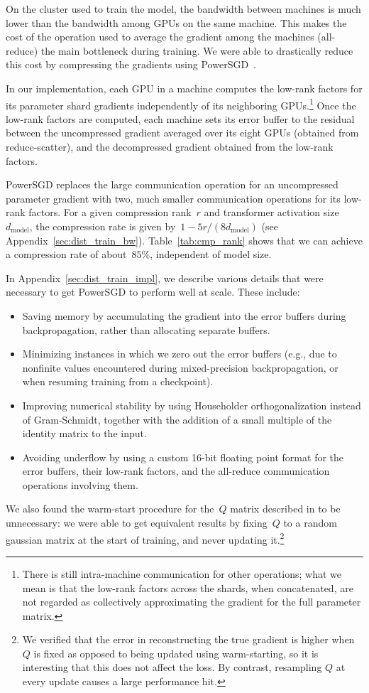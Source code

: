 \documentclass{article}
\begin{document}
On the cluster used to train the model, the bandwidth between machines is much lower than the bandwidth among GPUs on the same machine. This makes the cost of the operation used to average the gradient among the machines (all-reduce) the main bottleneck during training. We were able to drastically reduce this cost by compressing the gradients using PowerSGD~\cite{vogels2019powersgd}.

In our implementation, each GPU in a machine computes the low-rank factors for its parameter shard gradients independently of its neighboring GPUs.\footnote{There is still intra-machine communication for other operations; what we mean is that the low-rank factors across the shards, when concatenated, are not regarded as collectively approximating the gradient for the full parameter matrix.} Once the low-rank factors are computed, each machine sets its error buffer to the residual between the uncompressed gradient averaged over its eight GPUs (obtained from reduce-scatter), and the decompressed gradient obtained from the low-rank factors.

PowerSGD replaces the large communication operation for an uncompressed parameter gradient with two, much smaller communication operations for its low-rank factors. For a given compression rank~$r$ and transformer activation size~$d_\mathrm{model}$, the compression rate is given by~$1 - 5 r / (8 d_\textrm{model})$ (see Appendix~\ref{sec:dist_train_bw}). Table~\ref{tab:cmp_rank} shows that we can achieve a compression rate of about~$85\%$, independent of model size.

In Appendix~\ref{sec:dist_train_impl}, we describe various details that were necessary to get PowerSGD to perform well at scale. These include:
\begin{itemize}
    \item Saving memory by accumulating the gradient into the error buffers during backpropagation, rather than allocating separate buffers.
    \item Minimizing instances in which we zero out the error buffers (e.g., due to nonfinite values encountered during mixed-precision backpropagation, or when resuming training from a checkpoint).
    \item Improving numerical stability by using Householder orthogonalization instead of Gram-Schmidt, together with the addition of a small multiple of the identity matrix to the input.
    \item Avoiding underflow by using a custom 16-bit floating point format for the error buffers, their low-rank factors, and the all-reduce communication operations involving them.
\end{itemize}
We also found the warm-start procedure for the~$Q$ matrix described in \citet{vogels2019powersgd} to be unnecessary: we were able to get equivalent results by fixing~$Q$ to a random gaussian matrix at the start of training, and never updating it.\footnote{We verified that the error in reconstructing the true gradient is higher when~$Q$ is fixed as opposed to being updated using warm-starting, so it is interesting that this does not affect the loss. By contrast, resampling $Q$ at every update causes a large performance hit.}
%
\end{document}
